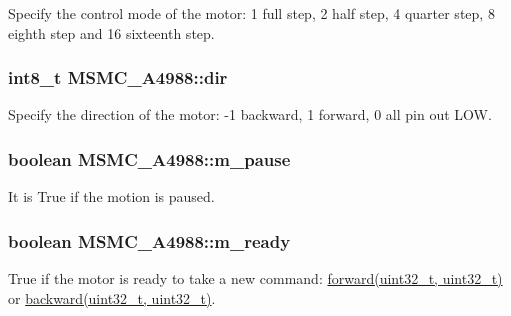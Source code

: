 Specify the control mode of the motor\+: 1 full step, 2 half step, 4 quarter step, 8 eighth step and 16 sixteenth step. 

\hypertarget{class_m_s_m_c___a4988_a887a3d29966bdfc0d920d339b83e5346}{
\subsubsection[{dir}]{\setlength{\rightskip}{0pt plus 5cm}int8\+\_\+t M\+S\+M\+C\+\_\+\+A4988\+::dir\hspace{0.3cm}{\ttfamily [private]}}}\label{class_m_s_m_c___a4988_a887a3d29966bdfc0d920d339b83e5346}


Specify the direction of the motor\+: -\/1 backward, 1 forward, 0 all pin out L\+O\+W. 

\hypertarget{class_m_s_m_c___a4988_a26b4b55d77fadf599d7208c0a1ce2383}{
\subsubsection[{m\+\_\+pause}]{\setlength{\rightskip}{0pt plus 5cm}boolean M\+S\+M\+C\+\_\+\+A4988\+::m\+\_\+pause\hspace{0.3cm}{\ttfamily [private]}}}\label{class_m_s_m_c___a4988_a26b4b55d77fadf599d7208c0a1ce2383}


It is True if the motion is paused. 

\hypertarget{class_m_s_m_c___a4988_a86ef4c886ee6c7ed6fa87e27c0a7a9ea}{
\subsubsection[{m\+\_\+ready}]{\setlength{\rightskip}{0pt plus 5cm}boolean M\+S\+M\+C\+\_\+\+A4988\+::m\+\_\+ready\hspace{0.3cm}{\ttfamily [private]}}}\label{class_m_s_m_c___a4988_a86ef4c886ee6c7ed6fa87e27c0a7a9ea}


True if the motor is ready to take a new command\+: \hyperlink{class_m_s_m_c___a4988_a9acdbabf546656a6436e89579e8fcfca}{forward(uint32\+\_\+t, uint32\+\_\+t)} or \hyperlink{class_m_s_m_c___a4988_a836bed9e28e723ead2a94446bb704869}{backward(uint32\+\_\+t, uint32\+\_\+t)}. 

